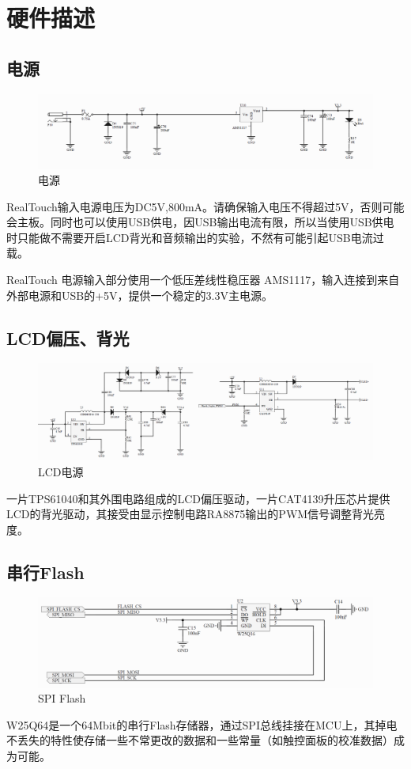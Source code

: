 \documentclass[titlepage]{article}
\begin{document}
 \section{硬件描述}
 \subsection{电源}
 \begin{figure}[h]
 \centering
 \includegraphics[width=15cm]{power.png}
 \caption{电源}
 \end{figure}
RealTouch输入电源电压为DC5V,800mA。请确保输入电压不得超过5V，否则可能会主板。同时也可以使用USB供电，因USB输出电流有限，所以当使用USB供电时只能做不需要开启LCD背光和音频输出的实验，不然有可能引起USB电流过载。

RealTouch 电源输入部分使用一个低压差线性稳压器
AMS1117，输入连接到来自外部电源和USB的+5V，提供一个稳定的3.3V主电源。
 \subsection{LCD偏压、背光}
  \begin{figure}[h]
  \centering
  \includegraphics[width=15cm]{lcd_power.png}
  \caption{LCD电源}
 \end{figure}
 一片TPS61040和其外围电路组成的LCD偏压驱动，一片CAT4139升压芯片提供LCD的背光驱动，其接受由显示控制电路RA8875输出的PWM信号调整背光亮度。
 \newpage
 \subsection{串行Flash}
  \begin{figure}[h]
  \centering
  \includegraphics[width=15cm]{spiflash.png}
  \caption{SPI Flash}
 \end{figure}
 W25Q64是一个64Mbit的串行Flash存储器，通过SPI总线挂接在MCU上，其掉电不丢失的特性使存储一些不常更改的数据和一些常量（如触控面板的校准数据）成为可能。
 \newpage
\end{document}
